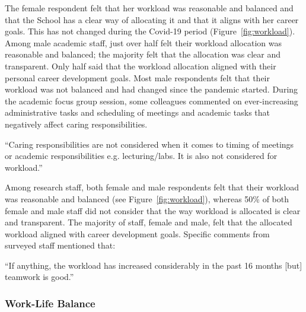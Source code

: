 The female respondent felt that her workload was reasonable and balanced and that the School has a clear way of allocating it and that it aligns with her career goals. This has not changed during the Covid-19 period (Figure~\ref{fig:workload}). %
Among male academic staff, just over half felt their workload allocation was reasonable and balanced; the majority felt that the allocation was clear and transparent. Only half said that the workload allocation aligned with their personal career development goals. Most male respondents felt that their workload was not balanced and had changed since the pandemic started. During the academic focus group session, some colleagues commented on ever-increasing administrative tasks and scheduling of meetings and academic tasks that negatively affect caring responsibilities. %


\begin{myquote}
“Caring responsibilities are not considered when it comes to timing of meetings or academic responsibilities e.g. lecturing/labs. It is also not considered for workload.”
\end{myquote}

Among research staff, both female and male respondents felt that their workload was reasonable and balanced (see Figure~\ref{fig:workload}), whereas 50\% of both female and male staff did not consider that the way workload is allocated is clear and transparent. The majority of staff, female and male, felt that the allocated workload aligned with career development goals. Specific comments from surveyed staff mentioned that:

\begin{myquote}
“If anything, the workload has increased considerably in the past 16 months [but] teamwork is good.”
\end{myquote}


\subsubsection{Work-Life Balance}

